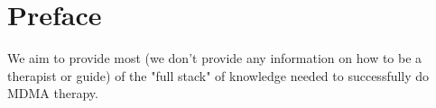 \documentclass[12pt,letterpaper]{book}
\begin{document}

\chapter*{Preface}
We aim to provide most (we don't provide any information on how to be a therapist or guide) of the "full stack" of knowledge needed to successfully do MDMA therapy.
\end{document}
